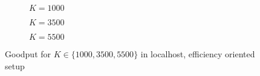 \begin{figure}[t]
\centering
\begin{subfigure}{0.24\textwidth}
	\captionsetup{justification=centering,font=scriptsize}
	\centering
	\setlength\fwidth{\textwidth}
	\setlength{}
	\caption{$K=1000$}
	\label{fig:lh_good_1000_eff}
\end{subfigure}\hspace{2em}%
\begin{subfigure}{0.23\textwidth}
	\captionsetup{justification=centering,font=scriptsize}
	\centering
	\setlength\fwidth{\textwidth}
	\setlength{}
	\caption{$K=3500$}
	\label{fig:lh_good_3500_eff}
\end{subfigure}\hspace{2em}%
\begin{subfigure}{0.23\textwidth}
	\captionsetup{justification=centering,font=scriptsize}
	\centering
	\setlength\fwidth{\textwidth}
	\setlength{}
	\caption{$K=5500$}
	\label{fig:lh_good_5500_eff}
\end{subfigure}
\caption{Goodput for $K \in \{1000, 3500, 5500\}$ in localhost, efficiency oriented setup}
\label{fig:goodput_nonaggr}
\end{figure}

